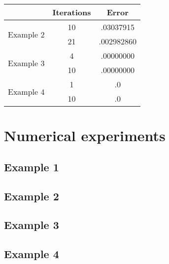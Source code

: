 \documentclass[11pt]{article}	%
\begin{document}
\begin{center}
    \begin{tabular}{||c|c|c||}
        \hline
        & Iterations & Error \\ [.35em]
        \hline
        \multirow{2}{5em}{Example 2} & 10 & .03037915 \\ [.25em]
        & 21 & .002982860 \\ [.25em]
        \hline
        \multirow{2}{5em}{Example 3} & 4 & .00000000 \\ [.25em]
        & 10 & .00000000 \\ [.25em]
        \hline
        \multirow{2}{5em}{Example 4} & 1 & .0 \\ [.25em]
        & 10 & .0 \\
        \hline
    \end{tabular}
\end{center}

\section{Numerical experiments}
\subsection{Example 1}

\subsection{Example 2}

\subsection{Example 3}

\subsection{Example 4}
\end{document}

